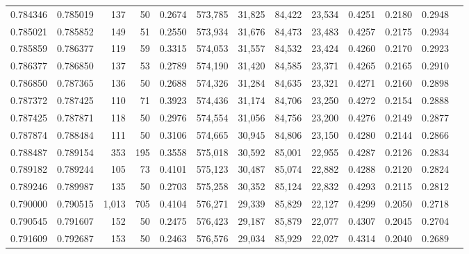 \begin{tabular}{rrrrrrrrrrrrr}
0.784346 & 0.785019 &   137 &  50 &                                     0.2674 & 573,785 &  31,825 &  84,422 &  23,534 & 0.4251 & 0.2180 & 0.2948 \\
0.785021 & 0.785852 &   149 &  51 &                                     0.2550 & 573,934 &  31,676 &  84,473 &  23,483 & 0.4257 & 0.2175 & 0.2934 \\
0.785859 & 0.786377 &   119 &  59 &                                     0.3315 & 574,053 &  31,557 &  84,532 &  23,424 & 0.4260 & 0.2170 & 0.2923 \\
0.786377 & 0.786850 &   137 &  53 &                                     0.2789 & 574,190 &  31,420 &  84,585 &  23,371 & 0.4265 & 0.2165 & 0.2910 \\
0.786850 & 0.787365 &   136 &  50 &                                     0.2688 & 574,326 &  31,284 &  84,635 &  23,321 & 0.4271 & 0.2160 & 0.2898 \\
0.787372 & 0.787425 &   110 &  71 &                                     0.3923 & 574,436 &  31,174 &  84,706 &  23,250 & 0.4272 & 0.2154 & 0.2888 \\
0.787425 & 0.787871 &   118 &  50 &                                     0.2976 & 574,554 &  31,056 &  84,756 &  23,200 & 0.4276 & 0.2149 & 0.2877 \\
0.787874 & 0.788484 &   111 &  50 &                                     0.3106 & 574,665 &  30,945 &  84,806 &  23,150 & 0.4280 & 0.2144 & 0.2866 \\
0.788487 & 0.789154 &   353 & 195 &                                     0.3558 & 575,018 &  30,592 &  85,001 &  22,955 & 0.4287 & 0.2126 & 0.2834 \\
0.789182 & 0.789244 &   105 &  73 &                                     0.4101 & 575,123 &  30,487 &  85,074 &  22,882 & 0.4288 & 0.2120 & 0.2824 \\
0.789246 & 0.789987 &   135 &  50 &                                     0.2703 & 575,258 &  30,352 &  85,124 &  22,832 & 0.4293 & 0.2115 & 0.2812 \\
0.790000 & 0.790515 & 1,013 & 705 &                                     0.4104 & 576,271 &  29,339 &  85,829 &  22,127 & 0.4299 & 0.2050 & 0.2718 \\
0.790545 & 0.791607 &   152 &  50 &                                     0.2475 & 576,423 &  29,187 &  85,879 &  22,077 & 0.4307 & 0.2045 & 0.2704 \\
0.791609 & 0.792687 &   153 &  50 &                                     0.2463 & 576,576 &  29,034 &  85,929 &  22,027 & 0.4314 & 0.2040 & 0.2689 \\

\end{tabular}
